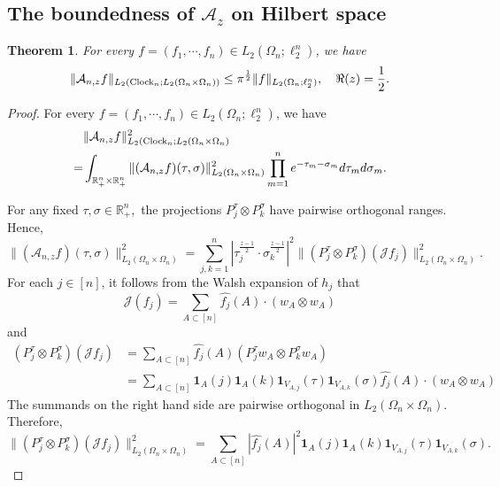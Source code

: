 \documentclass{amsart}
\numberwithin{equation}{section}
\newtheorem{thm}{Theorem}[section]
\theoremstyle{definition}
\theoremstyle{remark}
\newcommand{\1}{\mathbf 1}
\begin{document}
\subsection{The boundedness of $\mathcal{A}_{z}$ on Hilbert space}\label{sec:left}
\begin{thm}\label{thm:left}
For every $f=(f_1,\cdots,f_n)\in L_2(\Omega_n;\ell^n_2)$, we have
\begin{equation*}
\|\mathcal{A}_{n,z}f\|_{L_2({\rm Clock}_n;L_2(\Omega_n\times\Omega_n))}\leq\pi^{\frac12}\|f\|_{L_2(\Omega_n;\ell_2^n)},\quad \Re(z)=\frac12.
\end{equation*}
\end{thm}

\begin{proof} 
For every $f=(f_1,\cdots,f_n)\in L_2(\Omega_n;\ell^n_2)$,	we have
\begin{align*}
&\|\mathcal{A}_{n,z}f\|_{L_2({\rm Clock}_n;L_2(\Omega_n\times\Omega_n)}^2\\
=&\int_{\mathbb{R}^{n}_{+}\times \mathbb{R}^{n}_{+}}\|(\mathcal{A}_{n,z}f)(\tau,\sigma)\|_{L_2(\Omega_n\times\Omega_n)}^2\prod_{m=1}^ne^{-\tau_m-\sigma_m}d\tau_md\sigma_m.
\end{align*}

For any fixed $\tau,\sigma\in\mathbb{R}^n_+,$ the projections
$P_j^{\tau}\otimes P_k^{\sigma}$ have pairwise orthogonal ranges. Hence,
$$
\|(\mathcal{A}_{n,z}f)(\tau,\sigma)\|_{L_2(\Omega_n\times\Omega_n)}^2=\sum_{j,k=1}^n\left|\tau_j^{\frac{z-1}{2}}\cdot\sigma_k^{\frac{z-1}{2}}\right|^2
 \|(P_j^{\tau}\otimes P_k^{\sigma})(\mathcal{J}f_j)\|_{L_2(\Omega_n\times\Omega_n)}^2.
$$
For each $j\in  [n]$, it follows  from the Walsh expansion of $h_j$ that 
$$
\mathcal{J}(f_j)=\sum_{A\subset [n]} \widehat{f_j}(A)\cdot (w_A\otimes w_A)
$$
and
\begin{align*}
(P_j^{\tau}\otimes P_k^{\sigma})(\mathcal{J}f_{j})&=\sum_{A\subset  [n]}\widehat{f_j}(A)(P_j^{\tau}w_A\otimes P_k^{\sigma}w_A)\\
&=\sum_{A\subset [n]} \1_A(j)\1_A(k)\1_{V_{A,j}}(\tau)\1_{V_{A,k}}(\sigma)\widehat{f_j}(A)\cdot (w_A\otimes w_A)
\end{align*}
The summands on the right hand side are pairwise orthogonal in $L_2(\Omega_n\times\Omega_n).$ Therefore,
$$\|(P_j^{\tau}\otimes P_k^{\sigma})(\mathcal{J}f_j)\|_{L_2(\Omega_n\times\Omega_n)}^2=\sum_{A\subset [n]} |\widehat{f_j}(A)|^{2} \1_A(j)\1_A(k)\1_{V_{A,j}}(\tau)\1_{V_{A,k}}(\sigma).$$


\end{proof}
\end{document}
